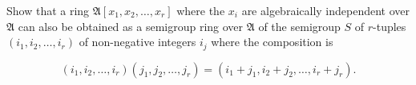 Show that a ring $\mathfrak{A}[x_1, x_2, \dots, x_r]$ where the $x_i$ are algebraically independent over $\mathfrak{A}$ can also be obtained as a semigroup ring over $\mathfrak{A}$ of the semigroup $S$ of $r$-tuples $(i_1, i_2, \dots, i_r)$ of non-negative integers $i_j$ where the composition is

$$(i_1, i_2, \dots, i_r)(j_1, j_2, \dots, j_r) = (i_1 + j_1, i_2 + j_2, \dots, i_r + j_r).$$